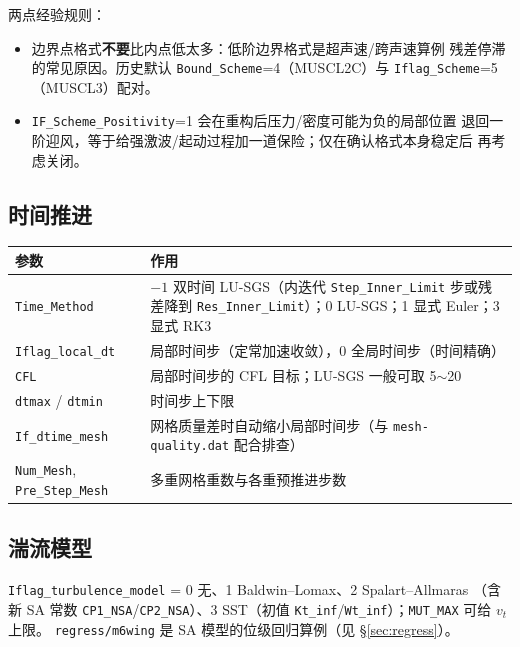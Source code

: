 \documentclass[11pt,a4paper]{ctexart}
\begin{document}
两点经验规则：
\begin{itemize}\itemsep2pt
  \item 边界点格式\textbf{不要}比内点低太多：低阶边界格式是超声速/跨声速算例
        残差停滞的常见原因。历史默认 \texttt{Bound\_Scheme}=4（MUSCL2C）与
        \texttt{Iflag\_Scheme}=5（MUSCL3）配对。
  \item \texttt{IF\_Scheme\_Positivity}=1 会在重构后压力/密度可能为负的局部位置
        退回一阶迎风，等于给强激波/起动过程加一道保险；仅在确认格式本身稳定后
        再考虑关闭。
\end{itemize}

\subsection{时间推进}

\begin{center}\small
\begin{tabular}{@{}>{\raggedright\arraybackslash}p{}>{\raggedright\arraybackslash}p{}@{}}
\toprule
参数 & 作用 \\
\midrule
\texttt{Time\_Method} & $-1$ 双时间 LU-SGS（内迭代 \texttt{Step\_Inner\_Limit} 步或残差降到 \texttt{Res\_Inner\_Limit}）；0 LU-SGS；1 显式 Euler；3 显式 RK3 \\
\texttt{Iflag\_local\_dt} & 1 局部时间步（定常加速收敛），0 全局时间步（时间精确） \\
\texttt{CFL} & 局部时间步的 CFL 目标；LU-SGS 一般可取 5$\sim$20 \\
\texttt{dtmax} / \texttt{dtmin} & 时间步上下限 \\
\texttt{If\_dtime\_mesh} & 网格质量差时自动缩小局部时间步（与 \texttt{mesh-quality.dat} 配合排查） \\
\texttt{Num\_Mesh}, \texttt{Pre\_Step\_Mesh} & 多重网格重数与各重预推进步数 \\
\bottomrule
\end{tabular}
\end{center}

\subsection{湍流模型}

\texttt{Iflag\_turbulence\_model} = 0 无、1 Baldwin--Lomax、2 Spalart--Allmaras
（含新 SA 常数 \texttt{CP1\_NSA}/\texttt{CP2\_NSA}）、3 SST（初值
\texttt{Kt\_inf}/\texttt{Wt\_inf}）；\texttt{MUT\_MAX} 可给 $v_t$ 上限。
\texttt{regress/m6wing} 是 SA 模型的位级回归算例（见 \S\ref{sec:regress}）。
\end{document}
